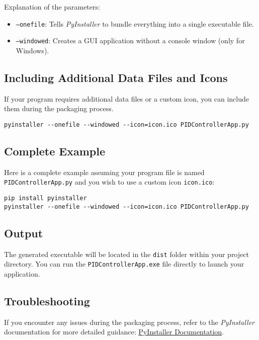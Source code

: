 \documentclass{article}
\begin{document}
Explanation of the parameters:
\begin{itemize}
    \item \texttt{--onefile}: Tells \textit{PyInstaller} to bundle everything into a single executable file.
    \item \texttt{--windowed}: Creates a GUI application without a console window (only for Windows).
\end{itemize}

\subsection{Including Additional Data Files and Icons}

If your program requires additional data files or a custom icon, you can include them during the packaging process.

\begin{verbatim}
pyinstaller --onefile --windowed --icon=icon.ico PIDControllerApp.py
\end{verbatim}

\subsection{Complete Example}

Here is a complete example assuming your program file is named \texttt{PIDControllerApp.py} and you wish to use a custom icon \texttt{icon.ico}:

\begin{verbatim}
pip install pyinstaller
pyinstaller --onefile --windowed --icon=icon.ico PIDControllerApp.py
\end{verbatim}

\subsection{Output}

The generated executable will be located in the \texttt{dist} folder within your project directory. You can run the \texttt{PIDControllerApp.exe} file directly to launch your application.

\subsection{Troubleshooting}

If you encounter any issues during the packaging process, refer to the \textit{PyInstaller} documentation for more detailed guidance: \href{https://pyinstaller.readthedocs.io/en/stable/}{PyInstaller Documentation}.
\end{document}
